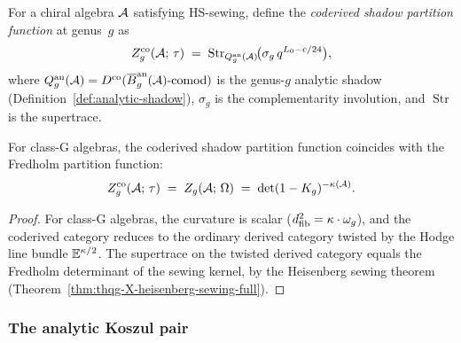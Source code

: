 \begin{definition}%
\label{def:thqg-X-coderived-shadow-pf}%
%
For a chiral algebra $\mathcal{A}$ satisfying HS-sewing, define the
\emph{coderived shadow partition function} at genus~$g$ as
\begin{equation}\label{eq:thqg-X-coderived-shadow-pf}
Z_g^{\mathrm{co}}(\mathcal{A};\,\tau)
\;=\;
\operatorname{Str}_{Q_g^{\mathrm{an}}(\mathcal{A})}
\!\bigl(\sigma_g\,q^{L_0 - c/24}\bigr),
\end{equation}
where $Q_g^{\mathrm{an}}(\mathcal{A})
= D^{\mathrm{co}}(\overline{B}^{\mathrm{an}}_g(\mathcal{A})\text{-comod})$ is the
genus-$g$ analytic shadow
\textup{(}Definition~\textup{\ref{def:analytic-shadow}}\textup{)},
$\sigma_g$ is the complementarity involution, and
$\operatorname{Str}$ is the supertrace.
\end{definition}

\begin{proposition}[Coderived = Fredholm for class~G;
\ClaimStatusProvedHere]%
\label{prop:thqg-X-coderived-fredholm-G}%
%
For class-G algebras, the coderived shadow partition function
coincides with the Fredholm partition function:
\begin{equation}\label{eq:thqg-X-coderived-fredholm-agreement}
Z_g^{\mathrm{co}}(\mathcal{A};\,\tau)
\;=\;
Z_g(\mathcal{A};\,\Omega)
\;=\;
\det(1 - K_g)^{-\kappa(\mathcal{A})}.
\end{equation}
\end{proposition}

\begin{proof}
For class-G algebras, the curvature is scalar
($d_{\mathrm{fib}}^2 = \kappa \cdot \omega_g$), and the coderived category
reduces to the ordinary derived category twisted by the Hodge
line bundle $\mathbb{E}^{\kappa/2}$. The supertrace on
the twisted derived category equals the Fredholm determinant
of the sewing kernel, by the Heisenberg sewing theorem
(Theorem~\ref{thm:thqg-X-heisenberg-sewing-full}).
\end{proof}

\subsubsection{The analytic Koszul pair}

